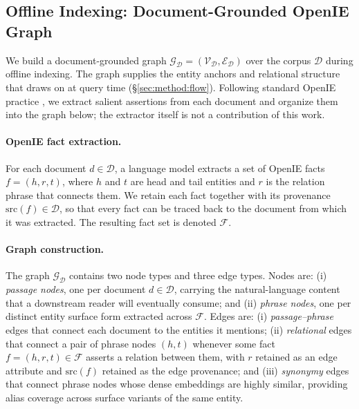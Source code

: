 \subsection{Offline Indexing: Document-Grounded OpenIE Graph}
\label{sec:method:substrate}

We build a document-grounded graph
$\mathcal{G}_{\mathcal{D}}=(\mathcal{V}_{\mathcal{D}},\mathcal{E}_{\mathcal{D}})$
over the corpus $\mathcal{D}$ during offline indexing. The graph supplies
the entity anchors and relational structure that \methodname{} draws on at
query time (\S\ref{sec:method:flow}). Following standard OpenIE practice
\citep{angeli2015leveraging,gutierrez2025hipporag}, we extract salient
assertions from each document and organize them into the graph below; the
extractor itself is not a contribution of this work.

\paragraph{OpenIE fact extraction.}
For each document $d \in \mathcal{D}$, a language model extracts a set of
OpenIE facts $f = (h, r, t)$, where $h$ and $t$ are head and tail entities
and $r$ is the relation phrase that connects them. We retain each fact
together with its provenance $\mathrm{src}(f) \in \mathcal{D}$, so that
every fact can be traced back to the document from which it was extracted.
The resulting fact set is denoted $\mathcal{F}$.

\paragraph{Graph construction.}
The graph $\mathcal{G}_{\mathcal{D}}$ contains two node types and three
edge types. Nodes are: (i) \emph{passage nodes}, one per document
$d \in \mathcal{D}$, carrying the natural-language content that a
downstream reader will eventually consume; and (ii) \emph{phrase nodes},
one per distinct entity surface form extracted across $\mathcal{F}$.
Edges are: (i) \emph{passage--phrase} edges that connect each document to
the entities it mentions; (ii) \emph{relational} edges that connect a pair
of phrase nodes $(h, t)$ whenever some fact $f = (h, r, t) \in \mathcal{F}$
asserts a relation between them, with $r$ retained as an edge attribute
and $\mathrm{src}(f)$ retained as the edge provenance; and (iii)
\emph{synonymy} edges that connect phrase nodes whose dense embeddings
are highly similar, providing alias coverage across surface variants of
the same entity.


